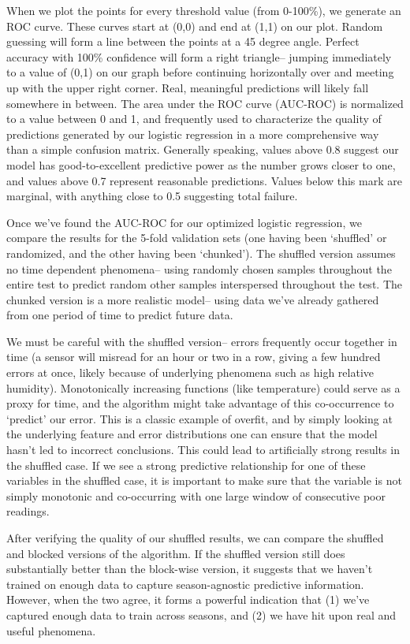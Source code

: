 When we plot the points for every threshold value (from 0-100\%), we generate an ROC curve.  These curves start at (0,0) and end at (1,1) on our plot.  Random guessing will form a line between the points at a 45 degree angle.  Perfect accuracy with 100\% confidence will form a right triangle-- jumping immediately to a value of (0,1) on our graph before continuing horizontally over and meeting up with the upper right corner.  Real, meaningful predictions will likely fall somewhere in between.  The area under the ROC curve (AUC-ROC) is normalized to a value between 0 and 1, and frequently used to characterize the quality of predictions generated by our logistic regression in a more comprehensive way than a simple confusion matrix.  Generally speaking, values above 0.8 suggest our model has good-to-excellent predictive power as the number grows closer to one, and values above 0.7 represent reasonable predictions.  Values below this mark are marginal, with anything close to 0.5 suggesting total failure.

Once we've found the AUC-ROC for our optimized logistic regression, we compare the results for the 5-fold validation sets (one having been `shuffled' or randomized, and the other having been `chunked').  The shuffled version assumes no time dependent phenomena-- using randomly chosen samples throughout the entire test to predict random other samples interspersed throughout the test.  The chunked version is a more realistic model-- using data we've already gathered from one period of time to predict future data.  

We must be careful with the shuffled version-- errors frequently occur together in time (a sensor will misread for an hour or two in a row, giving a few hundred errors at once, likely because of underlying phenomena such as high relative humidity).  Monotonically increasing functions (like temperature) could serve as a proxy for time, and the algorithm might take advantage of this co-occurrence to `predict' our error.  This is a classic example of overfit, and by simply looking at the underlying feature and error distributions one can ensure that the model hasn't led to incorrect conclusions.  This could lead to artificially strong results in the shuffled case.  If we see a strong predictive relationship for one of these variables in the shuffled case, it is important to make sure that the variable is not simply monotonic and co-occurring with one large window of consecutive poor readings.  

After verifying the quality of our shuffled results, we can compare the shuffled and blocked versions of the algorithm.  If the shuffled version still does substantially better than the block-wise version, it suggests that we haven't trained on enough data to capture season-agnostic predictive information.  However, when the two agree, it forms a powerful indication that (1) we've captured enough data to train across seasons, and (2) we have hit upon real and useful phenomena.  